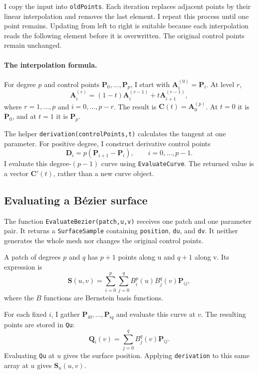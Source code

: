 \documentclass[acmtog]{acmart}
\begin{document}
I copy the input into \texttt{oldPoints}. Each iteration replaces adjacent points by their linear interpolation and removes the last element. I repeat this process until one point remains. Updating from left to right is suitable because each interpolation reads the following element before it is overwritten. The original control points remain unchanged.

\paragraph{The interpolation formula.}
For degree $p$ and control points $\mathbf P_0,\ldots,\mathbf P_p$, I start with $\mathbf A_i^{(0)}=\mathbf P_i$. At level $r$,
\begin{equation}
\mathbf A_i^{(r)}
=(1-t)\mathbf A_i^{(r-1)}+t\mathbf A_{i+1}^{(r-1)},
\end{equation}
where $r=1,\ldots,p$ and $i=0,\ldots,p-r$. The result is $\mathbf C(t)=\mathbf A_0^{(p)}$. At $t=0$ it is $\mathbf P_0$, and at $t=1$ it is $\mathbf P_p$.

The helper \texttt{derivation(controlPoints,t)} calculates the tangent at one parameter. For positive degree, I construct derivative control points
\begin{equation}
\mathbf D_i=p(\mathbf P_{i+1}-\mathbf P_i),
\qquad i=0,\ldots,p-1.
\end{equation}
I evaluate this degree-$(p-1)$ curve using \texttt{EvaluateCurve}. The returned value is a vector $\mathbf C'(t)$, rather than a new curve object.

\subsection{Evaluating a B\'ezier surface}
The function \texttt{EvaluateBezier(patch,u,v)} receives one patch and one parameter pair. It returns a \texttt{SurfaceSample} containing \texttt{position}, \texttt{du}, and \texttt{dv}. It neither generates the whole mesh nor changes the original control points.

A patch of degrees $p$ and $q$ has $p+1$ points along u and $q+1$ along v. Its expression is
\begin{equation}
\mathbf S(u,v)=
\sum_{i=0}^{p}\sum_{j=0}^{q} B_i^p(u)B_j^q(v)\mathbf P_{ij},
\end{equation}
where the $B$ functions are Bernstein basis functions.

For each fixed $i$, I gather $\mathbf P_{i0},\ldots,\mathbf P_{iq}$ and evaluate this curve at $v$. The resulting points are stored in \texttt{Qu}:
\begin{equation}
\mathbf Q_i(v)=\sum_{j=0}^{q}B_j^q(v)\mathbf P_{ij}.
\end{equation}
Evaluating \texttt{Qu} at $u$ gives the surface position. Applying \texttt{derivation} to this same array at $u$ gives $\mathbf S_u(u,v)$.
\end{document}
